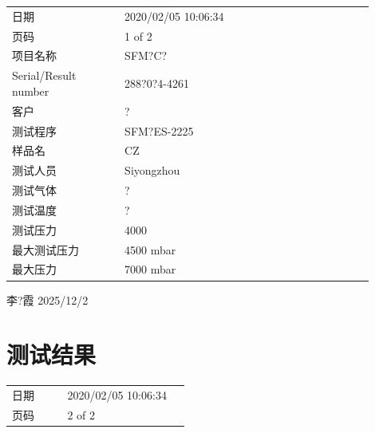 \documentclass[UTF8,10pt,a4paper,fontset=fandol]{ctexart}
\newcommand{\fieldvalue}[1]{#1}
\newcommand{\handwritten}[1]{#1}
\begin{document}
\begin{tabular}{@{}p{0.28\linewidth}p{0.62\linewidth}@{}}
日期 &
\fieldvalue{2020/02/05 10:06:34}
\\
页码 &
\fieldvalue{1 of 2}
\\
项目名称 &
\fieldvalue{SFM?C?}
\\
Serial/Result number &
\fieldvalue{288?0?4-4261}
\\
客户 &
\fieldvalue{?}
\\
测试程序 &
\fieldvalue{SFM?ES-2225}
\\
样品名 &
\fieldvalue{CZ}
\\
测试人员 &
\fieldvalue{Siyongzhou}
\\
测试气体 &
\fieldvalue{?}
\\
测试温度 &
\fieldvalue{?}
\\
测试压力 &
\fieldvalue{4000}
\\
最大测试压力 &
\fieldvalue{4500 mbar}
\\
最大压力 &
\fieldvalue{7000 mbar}
\end{tabular}

\vspace{1em}

\handwritten{李?霞}
\qquad
\handwritten{2025/12/2}

\section{测试结果}

\begin{tabular}{@{}p{0.28\linewidth}p{0.62\linewidth}@{}}
日期 &
\fieldvalue{2020/02/05 10:06:34}
\\
页码 &
\fieldvalue{2 of 2}
\end{tabular}
\end{document}
